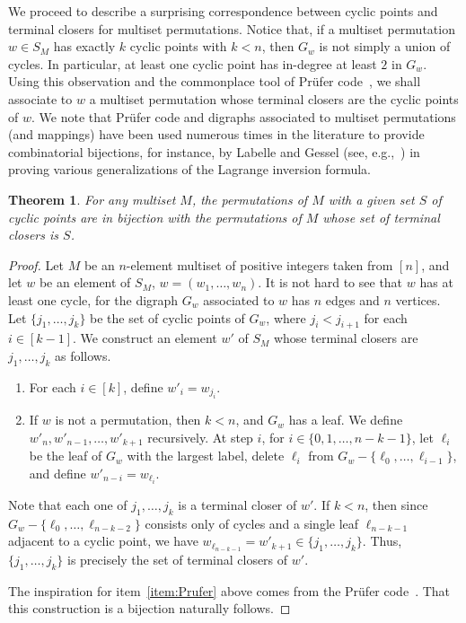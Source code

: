 \documentclass[letterpaper]{amsart}
\theoremstyle{plain}
\newtheorem{theorem}{Theorem}
\theoremstyle{definition}
\theoremstyle{remark}
\begin{document}
We proceed to describe a surprising correspondence between cyclic points and terminal closers for multiset permutations.
Notice that, if a multiset permutation $w \in S_M$ has exactly $k$ cyclic points with $k < n$, then $G_w$ is not simply a union of cycles. In particular, at least one cyclic point has in-degree at least $2$ in $G_w$. Using this observation and the commonplace tool of  Pr\"ufer code~{\cite{Prufer1918}}, we shall associate to $w$ a multiset permutation whose terminal closers are the cyclic points of $w$. We note that Pr\"ufer code and digraphs associated to multiset permutations (and mappings) have been used numerous times in the literature to provide combinatorial bijections, for instance, by Labelle and Gessel (see, e.g.,~{\cite{Gessel1995, Gessel2016}}) in proving various generalizations of the Lagrange inversion formula.

\begin{theorem}\label{thm:cyclic-terminal}
For any multiset $M$, the permutations of $M$ with a given set $S$ of cyclic points are in bijection with the permutations of $M$ whose set of terminal closers is $S$.
\end{theorem}

\begin{proof}
Let $M$ be an $n$-element multiset of positive integers taken from $[n]$, and let $w$ be an element of $S_M$, $w = (w_1, \ldots, w_n)$.
It is not hard to see that $w$ has at least one cycle, for the digraph $G_w$ associated to $w$ has $n$ edges and $n$ vertices.
Let $\{j_1, \ldots, j_k\}$ be the set of cyclic points of $G_w$, where $j_i < j_{i + 1}$ for each $i \in [k-1]$.
We construct an element $w'$ of $S_M$ whose terminal closers are $j_1, \ldots, j_k$ as follows.

\begin{enumerate}
    \item\label{item:cycles->terminals} For each $i \in [k]$, define $w'_i = w_{j_i}$.
    \item\label{item:Prufer} If $w$ is not a permutation, then $k < n$, and $G_w$ has a leaf.
    We define $w'_n, w'_{n-1}, \ldots, w'_{k+1}$ recursively.
    At step $i$, for $i \in \{0,1,\ldots, n-k-1\}$, let $\ell_i$ be the leaf of $G_w$ with the largest label, delete $\ell_i$ from $G_w - \{\ell_0, \ldots, \ell_{i-1}\}$, and define $w'_{n-i} = w_{\ell_i}$.
\end{enumerate}

Note that each one of $j_1, \ldots, j_k$ is a terminal closer of $w'$.
If $k < n$, then since $G_w - \{\ell_0, \ldots, \ell_{n-k-2}\}$ consists only of cycles and a single leaf $\ell_{n-k-1}$ adjacent to a cyclic point, we have $w_{\ell_{n-k-1}} = w'_{k+1} \in \{j_1, \ldots, j_k\}$.
Thus, $\{j_1, \ldots, j_k\}$ is precisely the set of terminal closers of $w'$.

The inspiration for item~\ref{item:Prufer} above comes from the Pr\"ufer code~\cite{Prufer1918}. That this construction is a bijection naturally follows.
\end{proof}
\end{document}
